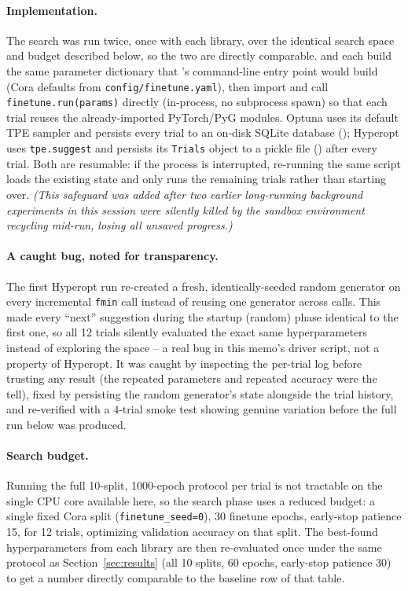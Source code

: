 \documentclass{article}
\begin{document}
\paragraph{Implementation.} The search was run twice, once with each
library, over the identical search space and budget described below, so
the two are directly comparable. 
and  each build the same parameter
dictionary that 's command-line entry point would build
(Cora defaults from \texttt{config/finetune.yaml}), then import and call
\texttt{finetune.run(params)} directly (in-process, no subprocess spawn)
so that each trial reuses the already-imported PyTorch/PyG modules. Optuna
uses its default TPE sampler and persists every trial to an on-disk SQLite
database (); Hyperopt uses
\texttt{tpe.suggest} and persists its \texttt{Trials} object to a pickle
file () after every trial.
Both are resumable: if the process is interrupted, re-running the same
script loads the existing state and only runs the remaining trials rather
than starting over. \emph{(This safeguard was added after two earlier
long-running background experiments in this session were silently killed
by the sandbox environment recycling mid-run, losing all unsaved
progress.)}

\paragraph{A caught bug, noted for transparency.} The first Hyperopt run
re-created a fresh, identically-seeded random generator on every
incremental \texttt{fmin} call instead of reusing one generator across
calls. This made every ``next'' suggestion during the startup (random)
phase identical to the first one, so all 12 trials silently evaluated the
exact same hyperparameters instead of exploring the space -- a real bug
in this memo's driver script, not a property of Hyperopt. It was caught
by inspecting the per-trial log before trusting any result (the repeated
parameters and repeated accuracy were the tell), fixed by persisting the
random generator's state alongside the trial history, and re-verified with
a 4-trial smoke test showing genuine variation before the full run below
was produced.

\paragraph{Search budget.} Running the full 10-split, 1000-epoch protocol
per trial is not tractable on the single CPU core available here, so the
search phase uses a reduced budget: a single fixed Cora split
(\texttt{finetune\_seed=0}), 30 finetune epochs, early-stop patience 15,
for 12 trials, optimizing validation accuracy on that split. The
best-found hyperparameters from each library are then re-evaluated once
under the same protocol as Section~\ref{sec:results} (all 10 splits, 60
epochs, early-stop patience 30) to get a number directly comparable to
the baseline row of that table.
\end{document}

